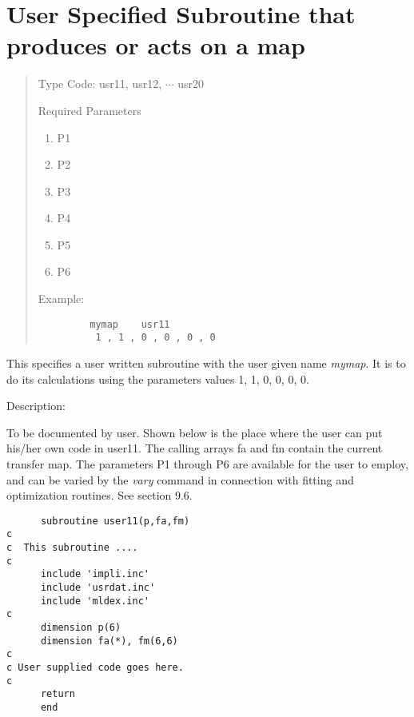 \section{User Specified Subroutine that produces or acts on a map}
\begin{quotation}
\noindent Type Code:  usr11, usr12, $\cdots$ usr20

\vspace{5mm}

\noindent Required Parameters
\begin{enumerate}
      \item  P1
      \item  P2
      \item  P3
      \item  P4
      \item  P5
      \item  P6
\end{enumerate}

\vspace{5mm}
\noindent     Example:
\begin{verbatim}
         mymap    usr11
          1 , 1 , 0 , 0 , 0 , 0
\end{verbatim}
\end{quotation}
This specifies a user written subroutine with the user given name {\em mymap}.
It is to do its calculations using the parameters values 1, 1, 0, 0, 0, 0.

\vspace{5mm}
     Description:
\vspace{2mm}

       To be documented by user.  Shown below is the place where the
		 user can put his/her own code in user11.  The calling arrays fa and fm
		 contain the current transfer map.  The parameters
		 P1 through P6 are available for the user to employ, and can be varied
		 by the {\em vary} command in connection with fitting and optimization
		 routines.  See section 9.6.

\begin{verbatim}
      subroutine user11(p,fa,fm)
c
c  This subroutine ....
c
      include 'impli.inc'
      include 'usrdat.inc'
      include 'mldex.inc'
c
      dimension p(6)
      dimension fa(*), fm(6,6)
c
c User supplied code goes here.
c
      return
      end
\end{verbatim}


\newpage



